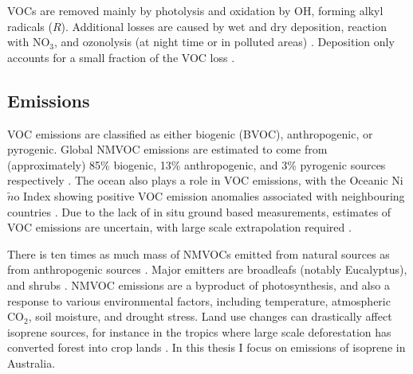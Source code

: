   VOCs are removed mainly by photolysis and oxidation by OH, forming alkyl 
  radicals ($R\dot{}$).
  Additional losses are caused by wet and dry deposition, reaction with NO$_3$, and ozonolysis (at night time or in polluted areas) \parencite{AtkinsonArey2003, Brown2009}.
  Deposition only accounts for a small fraction of the VOC loss 
  \parencite{AtkinsonArey2003}.
  
  
  \subsection{Emissions}
    \label{LR:VOCs:Emissions}
    
    VOC emissions are classified as either biogenic (BVOC), anthropogenic, or pyrogenic.
    Global NMVOC emissions are estimated to come from (approximately) 85\% biogenic, 13\% 
    anthropogenic, and 3\% pyrogenic sources respectively 
    \parencite{Kanakidou2005, Kefauver2014}.
    The ocean also plays a role in VOC emissions, with the Oceanic 
    Ni$\tilde{n}$o Index showing positive VOC emission anomalies associated 
    with neighbouring countries \parencite{Stavrakou2014}.
    Due to the lack of in situ ground based measurements, estimates of VOC 
    emissions are uncertain, with large scale extrapolation required 
    \parencite{Millet2006}.
    
    
    There is ten times as much mass of NMVOCs emitted from natural sources as 
    from anthropogenic sources \parencite{Guenther2006, Kanakidou2005, 
    Millet2006}.
    Major emitters are broadleafs (notably Eucalyptus), and shrubs \parencite{Guenther2006, Arneth2008, Niinemets2010, Monks2015}.
    NMVOC emissions are a byproduct of photosynthesis, and also a response to 
    various environmental factors, including temperature, atmospheric CO$_2$, 
    soil moisture, and drought stress.
    Land use changes can drastically affect isoprene sources, for instance in the tropics where large scale deforestation has converted forest into crop lands \parencite{Kanakidou2005}.
    In this thesis I focus on emissions of isoprene in Australia.
    
